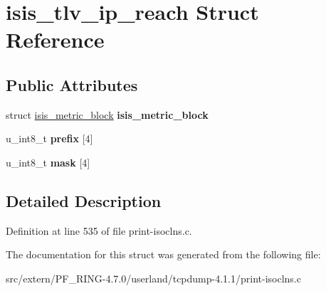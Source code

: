 \hypertarget{structisis__tlv__ip__reach}{
\section{isis\_\-tlv\_\-ip\_\-reach Struct Reference}
\label{structisis__tlv__ip__reach}
}
\subsection*{Public Attributes}
\begin{DoxyCompactItemize}
\item 
\hypertarget{structisis__tlv__ip__reach_a74193a03ce359fef2fa58bf324d690c4}{
struct \hyperlink{structisis__metric__block}{isis\_\-metric\_\-block} {\bfseries isis\_\-metric\_\-block}}
\label{structisis__tlv__ip__reach_a74193a03ce359fef2fa58bf324d690c4}

\item 
\hypertarget{structisis__tlv__ip__reach_ae5368cb42676fde3db43163e41b6017c}{
u\_\-int8\_\-t {\bfseries prefix} \mbox{[}4\mbox{]}}
\label{structisis__tlv__ip__reach_ae5368cb42676fde3db43163e41b6017c}

\item 
\hypertarget{structisis__tlv__ip__reach_a015d24a8895628049c275c84f8568841}{
u\_\-int8\_\-t {\bfseries mask} \mbox{[}4\mbox{]}}
\label{structisis__tlv__ip__reach_a015d24a8895628049c275c84f8568841}

\end{DoxyCompactItemize}


\subsection{Detailed Description}


Definition at line 535 of file print-\/isoclns.c.



The documentation for this struct was generated from the following file:\begin{DoxyCompactItemize}
\item 
src/extern/PF\_\-RING-\/4.7.0/userland/tcpdump-\/4.1.1/print-\/isoclns.c\end{DoxyCompactItemize}
